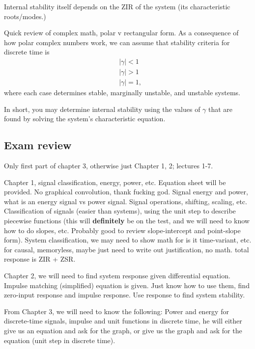 \documentclass{article}
\begin{document}
Internal stability itself depends on the ZIR of the system (its characteristic roots/modes.)

Quick review of complex math, polar v rectangular form. As a consequence of how polar complex numbers work, we can assume that stability criteria for discrete time is 
\begin{align*}
	&|\gamma| < 1 \\
	&|\gamma| > 1 \\
	&|\gamma| = 1,
\end{align*}
where each case determines stable, marginally unstable, and unstable systems.

In short, you may determine internal stability using the values of \(\gamma\) that are found by solving the system's characteristic equation.

\subsection{Exam review}

Only first part of chapter 3, otherwise just Chapter 1, 2; lectures 1-7.

Chapter 1, signal classification, energy, power, etc. Equation sheet will be provided. No graphical convolution, thank fucking god. Signal energy and power, what is an energy signal vs power signal. Signal operations, shifting, scaling, etc. Classification of signals (easier than systems), using the unit step to describe piecewise functions (this will \textbf{definitely} be on the test, and we will need to know how to do slopes, etc. Probably good to review slope-intercept and point-slope form). System classification, we may need to show math for is it time-variant, etc. for causal, memoryless, maybe just need to write out justification, no math. total response is ZIR + ZSR.

Chapter 2, we will need to find system response given differential equation. Impulse matching (simplified) equation is given. Just know how to use them, find zero-input response and impulse response. Use response to find system stability. 

From Chapter 3, we will need to know the following: 
Power and energy for discrete-time signals, impulse and unit functions in discrete time, he will either give us an equation and ask for the graph, or give us the graph and ask for the equation (unit step in discrete time).
\end{document}
